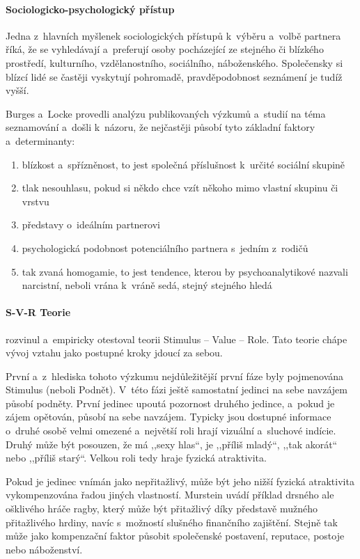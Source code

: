 \documentclass[a4paper, 12pt, notitlepage, oneside, numbers=noenddot]{report}
\begin{document}
\paragraph{Sociologicko-psychologický přístup}
Jedna z~hlavních myšlenek sociologických pří\-stu\-pů \citep{Planava1998}
k~výběru a~volbě partnera říká, že se vyhledávají a~preferují \hbox{osoby}
pocházející ze stejného či blízkého prostředí, kulturního,
vzdělanost\-ního, sociál\-ního, nábožen\-ského.  Společensky si blízcí lidé
se častěji vyskytují pohromadě, pravděpodobnost seznámení je tudíž
vyšší.

Burges a~Locke \citep{Planava1998} provedli analýzu publikovaných
výzkumů a~studií na téma seznamování a~došli k~názoru, že nejčastěji
působí tyto základní faktory a~determinanty:

\begin{enumerate}
\item blízkost a~spřízněnost, to jest společná příslušnost k~určité
  sociální skupině
\item tlak nesouhlasu, pokud si někdo chce vzít někoho mimo vlastní
  skupinu či vrstvu
\item představy o~ideálním partnerovi
\item psychologická podobnost potenciálního partnera s~jedním z~rodičů
\item tak zvaná homogamie, to jest tendence, kterou by
  psychoanalytikové nazvali narcistní, neboli vrána k~vráně sedá,
  stejný stejného hledá
\end{enumerate}
\paragraph[S{}--V{}--R Teorie]{S-V-R Teorie}
\citet{Murstein1970} rozvinul a~empiricky otestoval teorii
Stimulus -- Value -- Role. Tato teorie chápe vývoj vztahu jako postupné
kroky jdoucí za sebou.

První a~z~hlediska tohoto výzkumu nejdůležitější první fáze byly
pojmenována Stimulus (neboli Podnět).  V~této fázi ještě samostatní
jedinci na sebe navzájem působí podněty.  První jedinec upoutá
pozornost druhého jedince, a~pokud je zájem opětován, působí na sebe
navzájem.  Typicky jsou dostupné informace o~druhé osobě velmi
omezené a~největší roli hrají vizuální a~sluchové indície. Druhý může
být posouzen, že má ,,sexy hlas``, je ,,příliš mladý``, ,,tak akorát``
nebo ,,příliš starý``.  Velkou roli tedy hraje fyzická atraktivita.

Pokud je jedinec vnímán jako nepřitažlivý, může být jeho nižší fyzická
atraktivita vykompenzována řadou jiných vlastností.  Murstein uvádí
příklad drsného ale ošklivého hráče ragby, který může být přitažlivý
díky představě mužného přitažlivého hrdiny, navíc s~možností slušného
finančního zajištění.  Stejně tak může jako kompenzační faktor působit
společenské postavení, reputace, postoje nebo náboženství.
\end{document}
